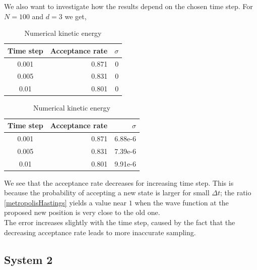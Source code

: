 \documentclass[english, a4paper]{article}
\begin{document}
\noindent We also want to investigate how the results depend on the chosen time step.
For $N = 100$ and $d = 3$ we get,
\begin{table}[H]
  \begin{minipage}{.5\linewidth}
  \centering
  \begin{tabular}{ | c | r | r |}
    \hline
    Time step& Acceptance rate& $\sigma$ \\*
    \hline
    0.001& 0.871& 0 \\*
    \hline
    0.005& 0.831& 0 \\*
    \hline
    0.01&  0.801& 0 \\*
    \hline
  \end{tabular}
  \caption{Analytical kinetic energy}
  \label{tab:Tabell5}
  \end{minipage}
  \begin{minipage}{.5\linewidth}
   \centering
    \begin{tabular}{ | c | r | r |}
    \hline
    Time step& Acceptance rate& $\sigma$ \\*
    \hline
    0.001& 0.871& 6.88e-6 \\*
    \hline
    0.005& 0.831& 7.39e-6 \\*
    \hline
    0.01&  0.801& 9.91e-6 \\*
    \hline
  \end{tabular}
  \caption{Numerical kinetic energy}
  \label{tab:Tabell1}
  \end{minipage}
\end{table}
We see that the acceptance rate decreases for increasing time step. This is because
the probability of accepting a new state is larger for small $\Delta t$; the ratio
\eqref{metropolisHastings} yields a value near $1$ when the wave function at the proposed 
new position is very close to the old one. \\

\noindent The error increases slightly with the time step, caused by the fact
that the decreasing acceptance rate leads to more inaccurate sampling.  

\subsection{System 2}
\end{document}

